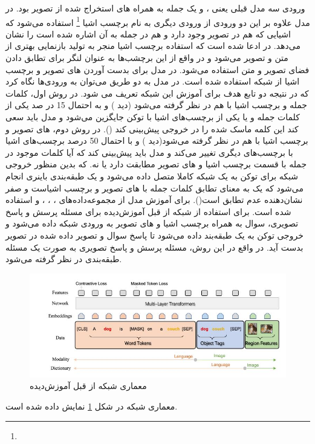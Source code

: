 	ورودی سه مدل قبلی یعنی 
	،
	و 
	یک جمله به همراه 
	های استخراج شده از تصویر بود. در مدل 
	علاوه بر این دو ورودی از ورودی دیگری به نام برچسب اشیا
	\footnote{}
	استفاده می‌شود که اشیایی که هم در تصویر وجود دارد و هم در جمله به آن اشاره شده است را نشان می‌دهد. در 
	\cite{li2020oscar}
ادعا شده است که استفاده برچسب اشیا منجر به تولید بازنمایی بهتری از متن و تصویر می‌شود و در واقع از این برچشب‌ها به عنوان لنگر برای تطابق دادن فضای تصویر و متن استفاده می‌شود. در مدل
	برای بدست آوردن 
	های تصویر و برچسب اشیا از شبکه 
	استفاده شده است. در مدل 
	به دو طریق می‌توان به ورود‌ی‌ها نگاه کرد که در نتیجه دو تابع هدف برای آموزش این شبکه تعریف می شود. در روش اول، کلمات جمله و برچسب اشیا با هم در نظر گرفته می‌شود (دید ) و به احتمال 15 در صد یکی از کلمات جمله و یا یکی از برچسب‌های اشیا با توکن 
	\lr{[MASK]}
	جایگزین می‌شود و مدل باید سعی کند این کلمه ماسک شده را در خروجی پیش‌بینی کند
	().
	در روش دوم،
	های تصویر و برچسب اشیا با هم در نظر گرفته می‌شود(دید ) و با احتمال 50 درصد برچسب‌های اشیا با برچسب‌های دیگری تغییر می‌کند و مدل باید پیش‌بینی کند که آیا کلمات موجود در جمله با قسمت برچسب اشیا و 
	های تصویر مطابقت دارد یا نه. که بدین منظور خروجی شبکه برای توکن
	\lr{[CLS]}
	به یک شبکه کاملا متصل داده می‌شود و یک طبقه‌بندی باینری انجام می‌شود که یک به معنای تطابق کلمات جمله با 
	های تصویر و برچسب اشیاست و صفر نشان‌دهنده عدم تطابق است().  برای آموزش مدل 
	از مجموعه‌داده‌های
	،
	،
	،
	و
	استفاده شده است. برای استفاده از شبکه از قبل آموزش‌دیده
	برای مسئله پرسش و پاسخ تصویری، سوال به همراه برچسب اشیا و 
	های تصویر به ورودی شبکه داده ‌می‌شود و خروجی توکن
	\lr{[CLS]}
	به یک طبقه‌بند داده ‌می‌شود تا پاسخ سوال و تصویر داده شده در تصویر بدست آید. در واقع در این روش، مسئله پرسش و پاسخ تصویری به صورت یک مسئله طبقه‌بندی در نظر گرفته ‌می‌شود.
	\begin{figure}
		\centerline{\includegraphics[scale=0.7]{images/OSCAR.JPG}}
		\caption[معماری شبکه از قبل آموزش‌دیده]{معماری شبکه از قبل آموزش‌دیده\cite{li2020oscar}}
		\label{fig:OSCAR}
	\end{figure}
	معماری شبکه 
	در شکل 
	\ref{fig:OSCAR}
	نمایش داده شده است.
	
